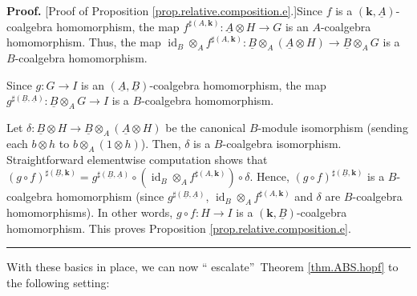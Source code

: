 \documentclass[numbers=enddot,12pt,final,onecolumn,notitlepage,abstracton]{scrartcl}%
\theoremstyle{definition}
\newenvironment{proof}[1][Proof]{\noindent\textbf{#1.} }{\ \rule{0.5em}{0.5em}}
\begin{document}
\begin{proof}
[Proof of Proposition \ref{prop.relative.composition.e}.]Since $f$ is a
$\left(  \mathbf{k},\underline{A}\right)  $-coalgebra homomorphism, the map
$f^{\sharp\left(  A,\mathbf{k}\right)  }:\underline{A}\otimes H\rightarrow G$
is an $A$-coalgebra homomorphism. Thus, the map $\operatorname*{id}%
\nolimits_{B}\otimes_{A}f^{\sharp\left(  A,\mathbf{k}\right)  }:\underline{B}%
\otimes_{A}\left(  \underline{A}\otimes H\right)  \rightarrow\underline{B}%
\otimes_{A}G$ is a $B$-coalgebra homomorphism.

Since $g:G\rightarrow I$ is an $\left(  \underline{A},\underline{B}\right)
$-coalgebra homomorphism, the map $g^{\sharp\left(  \underline{B}%
,\underline{A}\right)  }:\underline{B}\otimes_{A}G\rightarrow I$ is a
$B$-coalgebra homomorphism.

Let $\delta:\underline{B}\otimes H\rightarrow\underline{B}\otimes_{A}\left(
\underline{A}\otimes H\right)  $ be the canonical $B$-module isomorphism
(sending each $b\otimes h$ to $b\otimes_{A}\left(  1\otimes h\right)  $).
Then, $\delta$ is a $B$-coalgebra isomorphism. Straightforward elementwise
computation shows that $\left(  g\circ f\right)  ^{\sharp\left(
\underline{B},\mathbf{k}\right)  }=g^{\sharp\left(  \underline{B}%
,\underline{A}\right)  }\circ\left(  \operatorname*{id}\nolimits_{B}%
\otimes_{A}f^{\sharp\left(  A,\mathbf{k}\right)  }\right)  \circ\delta$.
Hence, $\left(  g\circ f\right)  ^{\sharp\left(  \underline{B},\mathbf{k}%
\right)  }$ is a $B$-coalgebra homomorphism (since $g^{\sharp\left(
\underline{B},\underline{A}\right)  }$, $\operatorname*{id}\nolimits_{B}%
\otimes_{A}f^{\sharp\left(  A,\mathbf{k}\right)  }$ and $\delta$ are
$B$-coalgebra homomorphisms). In other words, $g\circ f:H\rightarrow I$ is a
$\left(  \mathbf{k},\underline{B}\right)  $-coalgebra homomorphism. This
proves Proposition \ref{prop.relative.composition.e}.
\end{proof}

With these basics in place, we can now \textquotedblleft
escalate\textquotedblright\ Theorem \ref{thm.ABS.hopf} to the following setting:
\end{document}
